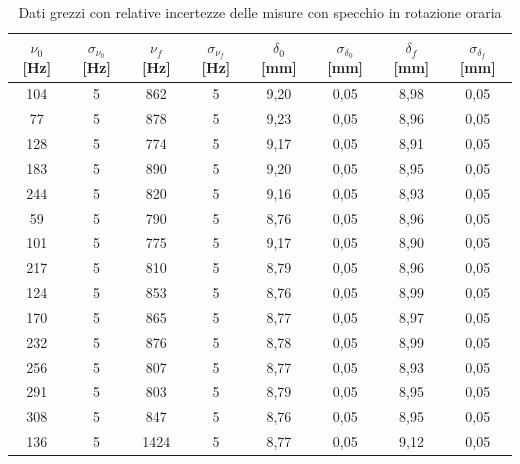 \documentclass{article}
\begin{document}
            \begin{table}[H]

                \centering
                \begin{tabular}{c c c c c c c c} 

                    \toprule
                    $\nu_0$ [Hz] & $\sigma_{\nu_0}$ [Hz] & $\nu_f$ [Hz] &  $\sigma_{\nu_f}$ [Hz] & 
                    $\delta_0$ [mm] & $\sigma_{\delta_0}$ [mm] & $\delta_f$ [mm] & $\sigma_{\delta_f}$ [mm] \\ 
                    
                    \midrule
                    104 & 5 & 862 &  5 & 9,20 & 0,05 & 8,98 & 0,05  \\ 
                    77  & 5 & 878 &  5 & 9,23 & 0,05 & 8,96 & 0,05  \\ 
                    128 & 5 & 774 &  5 & 9,17 & 0,05 & 8,91 & 0,05  \\
                    183 & 5 & 890 &  5 & 9,20 & 0,05 & 8,95 & 0,05  \\ 
                    244 & 5 & 820 &  5 & 9,16 & 0,05 & 8,93 & 0,05  \\ 
                    59  & 5 & 790 &  5 & 8,76 & 0,05 & 8,96 & 0,05  \\ 
                    101 & 5 & 775 &  5 & 9,17 & 0,05 & 8,90 & 0,05  \\ 
                    217 & 5 & 810 &  5 & 8,79 & 0,05 & 8,96 & 0,05  \\ 
                    124 & 5 & 853 &  5 & 8,76 & 0,05 & 8,99 & 0,05  \\ 
                    170 & 5 & 865 &  5 & 8,77 & 0,05 & 8,97 & 0,05  \\ 
                    232 & 5 & 876 &  5 & 8,78 & 0,05 & 8,99 & 0,05  \\ 
                    256 & 5 & 807 &  5 & 8,77 & 0,05 & 8,93 & 0,05  \\ 
                    291 & 5 & 803 &  5 & 8,79 & 0,05 & 8,95 & 0,05  \\ 
                    308 & 5 & 847 &  5 & 8,76 & 0,05 & 8,95 & 0,05  \\ 
                    136 & 5 & 1424 & 5 & 8,77 & 0,05 & 9,12 & 0,05  \\ 
                    \bottomrule           
                
                \end{tabular}
                \caption{Dati grezzi con relative incertezze delle misure con specchio in rotazione oraria}

            \end{table}
\end{document}

